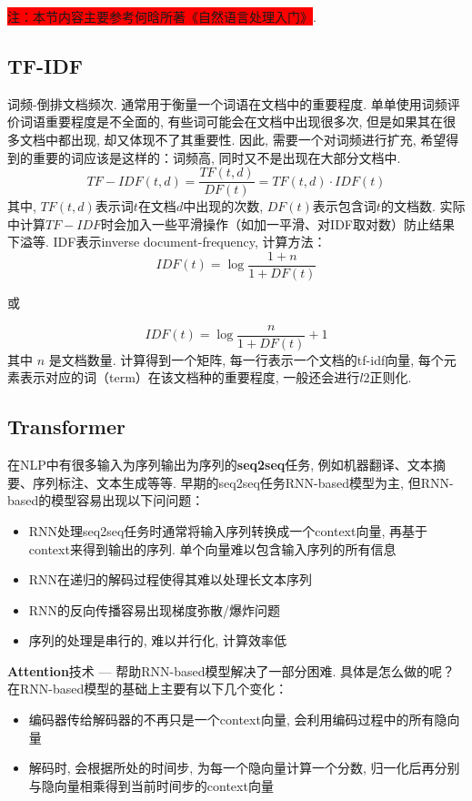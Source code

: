 \colorbox{red}{注：本节内容主要参考何晗所著《自然语言处理入门》}. 

\subsection{TF-IDF}
词频-倒排文档频次. 通常用于衡量一个词语在文档中的重要程度. 单单使用词频评价词语重要程度是不全面的, 有些词可能会在文档中出现很多次, 但是如果其在很多文档中都出现, 却又体现不了其重要性. 因此, 需要一个对词频进行扩充, 希望得到的重要的词应该是这样的：词频高, 同时又不是出现在大部分文档中. 
$$
TF-IDF(t, d) = \frac{TF(t, d)}{DF(t)} = TF(t, d) \cdot IDF(t)
$$
其中, $TF(t, d)$表示词$t$在文档$d$中出现的次数, $DF(t)$表示包含词$t$的文档数. 实际中计算$TF-IDF$时会加入一些平滑操作（如加一平滑、对IDF取对数）防止结果下溢等.  IDF表示inverse document-frequency, 计算方法：
$$
IDF(t) = \log \frac{1 + n}{1 + DF(t)}
$$
\begin{center}
	或
\end{center}
$$
IDF(t) = \log \frac{n}{1 + DF(t)} + 1
$$
其中 $n$ 是文档数量. 计算得到一个矩阵, 每一行表示一个文档的tf-idf向量, 每个元素表示对应的词（term）在该文档种的重要程度, 一般还会进行$l2$正则化. 

\subsection{Transformer}
在NLP中有很多输入为序列输出为序列的\textbf{seq2seq}任务, 例如机器翻译、文本摘要、序列标注、文本生成等等. 早期的seq2seq任务RNN-based\cite{sutskever2014sequence, cho2014learning}模型为主, 但RNN-based的模型容易出现以下问问题：
\begin{itemize}
	\item RNN处理seq2seq任务时通常将输入序列转换成一个context向量, 再基于context来得到输出的序列. 单个向量难以包含输入序列的所有信息
	\item RNN在递归的解码过程使得其难以处理长文本序列
	\item RNN的反向传播容易出现梯度弥散/爆炸问题
	\item 序列的处理是串行的, 难以并行化, 计算效率低
\end{itemize}
\textbf{Attention}\cite{bahdanau2016neural, luong2015effective}技术 --- 帮助RNN-based模型解决了一部分困难. 具体是怎么做的呢？在RNN-based模型的基础上主要有以下几个变化：
\begin{itemize}
	\item 编码器传给解码器的不再只是一个context向量, 会利用编码过程中的所有隐向量
	\item 解码时, 会根据所处的时间步, 为每一个隐向量计算一个分数, 归一化后再分别与隐向量相乘得到当前时间步的context向量
\end{itemize}


